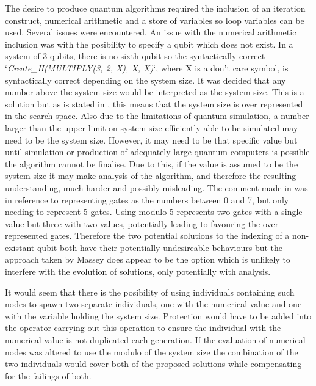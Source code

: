 \documentclass[authoryearcitations]{UoYCSproject}
\begin{document}
The desire to produce quantum algorithms required the inclusion of an iteration construct, numerical arithmetic and a store of variables so loop variables can be used.
Several issues were encountered.
An issue with the numerical arithmetic inclusion was with the posibility to specify a qubit which does not exist.
In a system of 3 qubits, there is no sixth qubit so the syntactically correct `\emph{Create\_H(MULTIPLY(3, 2, X), X, X)}`\cite{masseythesis}, where X is a don't care symbol, is syntactically correct depending on the system size.
It was decided that any number above the system size would be interpreted as the system size.
This is a solution but as is stated in \cite{Stepney07searchingfor}, this means that the system size is over represented in the search space.
Also due to the limitations of quantum simulation, a number larger than the upper limit on system size efficiently able to be simulated may need to be the system size.
However, it may need to be that specific value but until simulation or production of adequately large quantum computers is possible the algorithm cannot be finalise.
Due to this, if the value is assumed to be the system size it may make analysis of the algorithm, and therefore the resulting understanding, much harder and possibly misleading.
The comment made in \cite{Stepney07searchingfor} was in reference to representing gates as the numbers between 0 and 7, but only needing to represent 5 gates.
Using modulo 5 represents two gates with a single value but three with two values, potentially leading to favouring the over represented gates.
Therefore the two potential solutions to the indexing of a non-existant qubit both have their potentially undesireable behaviours but the approach taken by Massey does appear to be the option which is unlikely to interfere with the evolution of solutions, only potentially with analysis.

It would seem that there is the posibility of using individuals containing such nodes to spawn two separate individuals, one with the numerical value and one with the variable holding the system size.
Protection would have to be added into the operator carrying out this operation to ensure the individual with the numerical value is not duplicated each generation. 
If the evaluation of numerical nodes was altered to use the modulo of the system size the combination of the two individuals would cover both of the proposed solutions while compensating for the failings of both.
\end{document}
